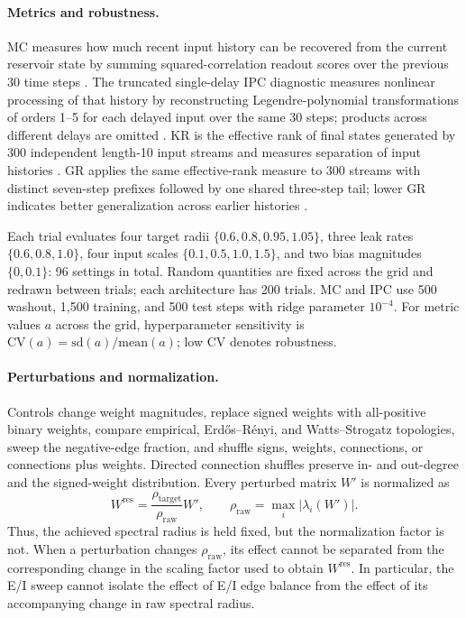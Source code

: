 \documentclass[mlabstract,onecolumn]{jmlr}
\begin{document}
\paragraph{Metrics and robustness.}
MC measures how much recent input history can be recovered from the current reservoir state by summing squared-correlation readout scores over the previous 30 time steps \citep{Jaeger2002STMESN}. The truncated single-delay IPC diagnostic measures nonlinear processing of that history by reconstructing Legendre-polynomial transformations of orders 1--5 for each delayed input over the same 30 steps; products across different delays are omitted \citep{dambre_ipc_2012}. KR is the effective rank of final states generated by 300 independent length-10 input streams and measures separation of input histories \citep{legenstein_maass_2007,roy_effective_rank_2007}. GR applies the same effective-rank measure to 300 streams with distinct seven-step prefixes followed by one shared three-step tail; lower GR indicates better generalization across earlier histories \citep{vidamour_quantifying_2022}.

Each trial evaluates four target radii $\{0.6,0.8,0.95,1.05\}$, three leak rates $\{0.6,0.8,1.0\}$, four input scales $\{0.1,0.5,1.0,1.5\}$, and two bias magnitudes $\{0,0.1\}$: 96 settings in total. Random quantities are fixed across the grid and redrawn between trials; each architecture has 200 trials. MC and IPC use 500 washout, 1,500 training, and 500 test steps with ridge parameter $10^{-4}$. For metric values $a$ across the grid, hyperparameter sensitivity is $\mathrm{CV}(a)=\mathrm{sd}(a)/\mathrm{mean}(a)$; low CV denotes robustness.

\paragraph{Perturbations and normalization.}
Controls change weight magnitudes, replace signed weights with all-positive binary weights, compare empirical, Erd\H{o}s--R\'enyi, and Watts--Strogatz topologies, sweep the negative-edge fraction, and shuffle signs, weights, connections, or connections plus weights. Directed connection shuffles preserve in- and out-degree and the signed-weight distribution. Every perturbed matrix $W'$ is normalized as
\begin{equation}
W^{\mathrm{res}}=\frac{\rho_{\mathrm{target}}}{\rho_{\mathrm{raw}}}W',
\qquad \rho_{\mathrm{raw}}=\max_i|\lambda_i(W')|.
\label{eq:normalization}
\end{equation}
Thus, the achieved spectral radius is held fixed, but the normalization factor is not. When a perturbation changes $\rho_{\mathrm{raw}}$, its effect cannot be separated from the corresponding change in the scaling factor used to obtain $W^{\mathrm{res}}$. In particular, the E/I sweep cannot isolate the effect of E/I edge balance from the effect of its accompanying change in raw spectral radius.
\end{document}
